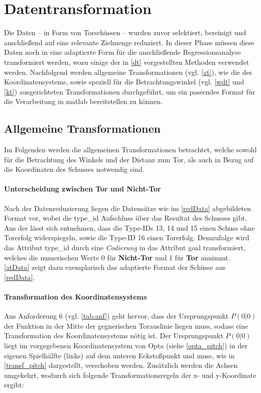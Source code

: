 \section{Datentransformation}
\label{dt}
Die Daten -- in Form von Torschüssen -- wurden zuvor selektiert, bereinigt und anschließend auf eine relevante Zielmenge reduziert. In dieser Phase müssen diese Daten noch in eine adaptierte Form für die anschließende Regressionsanalyse transformiert werden, wozu einige der in \vref{dt} vorgestellten Methoden verwendet werden. Nachfolgend werden allgemeine Transformationen (vgl. \vref{at}), wie die des Koordinatensystems, sowie speziell für die Betrachtungswinkel (vgl. \vref{wdt} und \vref{kt}) ausgerichteten Transformationen durchgeführt, um ein passendes Format für die Verarbeitung in \gls{matlab} bereitstellen zu können.


\subsection{Allgemeine Transformationen}
\label{at}
Im Folgenden werden die allgemeinen Transformationen betrachtet, welche sowohl für die Betrachtung des Winkels und der Distanz zum Tor, als auch in Bezug auf die Koordinaten des Schusses notwendig sind.

\paragraph{Unterscheidung zwischen Tor und Nicht-Tor} Nach der Datenreduzierung liegen die Datensätze wie im \vref{redData} abgebildeten Format vor, wobei die \textsf{type\_id} Aufschluss über das Resultat des Schusses gibt. Aus der  lässt sich entnehmen, dass die Type-IDs \textsf{13, 14} und \textsf{15} einen Schuss ohne Torerfolg widerspiegeln, sowie die Type-ID \textsf{16} einen Torerfolg. Demzufolge wird das Attribut \textsf{type\_id} durch eine \textit{Codierung} in das Attribut \textsf{goal} transformiert, welches die numerischen Werte \textsf{0} für \textbf{Nicht-Tor} und \textsf{1} für \textbf{Tor} annimmt. \vref{atData} zeigt dazu exemplarisch das adaptierte Format der Schüsse aus \vref{redData}.

\paragraph{Transformation des Koordinatensystems}
Aus Anforderung 6 (vgl. \vref{tab:anf}) geht hervor, dass der Ursprungspunkt $P(0|0)$ der Funktion in der Mitte der gegnerischen Torauslinie liegen muss, sodass eine Transformation des Koordinatensystems nötig ist. Der Ursprungspunkt $P(0|0)$ liegt im  vorgegebenen Koordinatensystem von Opta (siehe \vref{opta_pitch}) in der eigenen Spielhälfte (links) auf dem unteren Eckstoßpunkt und muss, wie in \vref{transf_pitch} dargestellt, verschoben werden. Zusätzlich werden die Achsen umgekehrt, wodurch sich folgende Transformationsregeln der x- und y-Koordinate ergibt:\enlargethispage{\baselineskip}\newline

